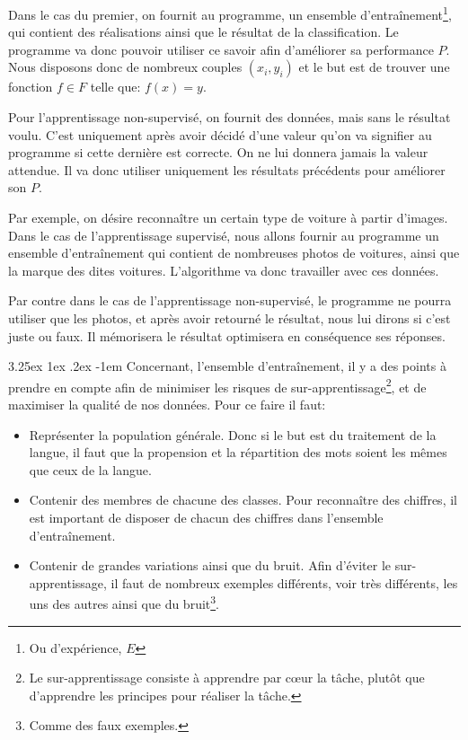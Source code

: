 \documentclass[a4paper, 11pt]{article}
\makeatletter
\renewcommand\paragraph{\@startsection{paragraph}{5}{\z@}%
  {3.25ex \@plus1ex \@minus.2ex}%
  {-1em}%
  {\normalfont\normalsize\bfseries}}
\makeatother
\begin{document}
Dans le cas du premier, on fournit au programme, un ensemble d'entraînement\footnote{Ou d'expérience, $E$},
qui contient des réalisations ainsi que le résultat de la classification. 
Le programme va donc pouvoir utiliser ce savoir afin d'améliorer sa performance $P$.
Nous disposons donc de nombreux couples $(x_i, y_i)$ et le but est de trouver une fonction $f \in F$ telle que: $f(x) = y$.

Pour l'apprentissage non-supervisé, on fournit des données, mais sans le résultat voulu.
C'est uniquement après avoir décidé d'une valeur qu'on va signifier au programme si cette dernière est correcte.
On ne lui donnera jamais la valeur attendue. Il va donc utiliser uniquement les résultats précédents pour améliorer son $P$.

Par exemple, on désire reconnaître un certain type de voiture à partir d'images. Dans le cas de l'apprentissage supervisé,
nous allons fournir au programme un ensemble d'entraînement qui contient de nombreuses photos de voitures,
ainsi que la marque des dites voitures. L'algorithme va donc travailler avec ces données.

Par contre dans le cas de l'apprentissage non-supervisé, le programme ne pourra utiliser que les photos,
et après avoir retourné le résultat, nous lui dirons si c'est juste ou faux. Il mémorisera le résultat 
optimisera en conséquence ses réponses.

\paragraph{}
Concernant, l'ensemble d'entraînement, il y a des points à prendre en compte afin de minimiser les risques de sur-apprentissage\footnote{Le sur-apprentissage consiste à apprendre par cœur la tâche, plutôt que d'apprendre les principes pour réaliser la tâche.}, et de maximiser la qualité de nos données.
Pour ce faire il faut:\label{astuce ensemble d'entraînement}
\begin{itemize}
\item Représenter la population générale. Donc si le but est du traitement de la langue, 
il faut que la propension et la répartition des mots soient les mêmes que ceux de la langue.

\item Contenir des membres de chacune des classes. Pour reconnaître des chiffres, il est important de disposer de chacun 
des chiffres dans l'ensemble d'entraînement.
\item Contenir de grandes variations ainsi que du bruit. Afin d'éviter le sur-apprentissage, 
il faut de nombreux exemples différents, voir très différents, les uns des autres ainsi que 
du bruit\footnote{Comme des faux exemples.}.
\end{itemize}
\end{document}
